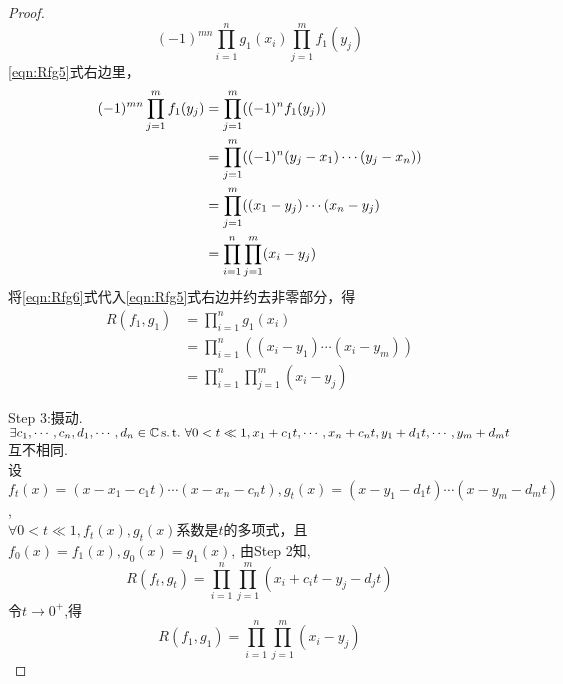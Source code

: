 \begin{proof}
\begin{equation}
    (-1)^{mn}\prod_{i=1}^ng_1(x_i)\prod_{j=1}^mf_1(y_j)
  \end{equation}
  \eqref{eqn:Rfg5}式右边里，
  \begin{align}\label{eqn:Rfg6}
    (-1)^{mn}\prod_{j=1}^mf_1(y_j)&=\prod_{j=1}^m((-1)^nf_1(y_j))\notag\\
                               &=\prod_{j=1}^m((-1)^n(y_j-x_1)\cdots(y_j-x_n))\notag\\
                               &=\prod_{j=1}^m((x_1-y_j)\cdots(x_n-y_j)\notag\\
                               &=\prod_{i=1}^n\prod_{j=1}^m(x_i-y_j)
  \end{align}
  将\eqref{eqn:Rfg6}式代入\eqref{eqn:Rfg5}式右边并约去非零部分，得
  \begin{align*}
    R(f_1,g_1) & = \prod_{i=1}^ng_1(x_i)\\
           & = \prod_{i=1}^n((x_i-y_1)\cdots(x_i-y_m))\\
           & = \prod_{i=1}^n\prod_{j=1}^m(x_i-y_j)
  \end{align*}

  {\heiti Step 3}:摄动.
  $\exists  c_1, \cdots, c_n, d_1, \cdots, d_n \in \mathbb{C}\\
  \operatorname{s.t.{}} \forall 0 < t \ll 1, x_1+c_1t, \cdots, x_n+c_nt, y_1+d_1t, \cdots, y_m+d_mt$互不相同.\\
  设$f_t(x)=(x-x_1-c_1t)\cdots(x-x_n-c_nt), g_t(x)=(x-y_1-d_1t)\cdots(x-y_m-d_mt)$,\\
  $\forall 0 < t \ll 1, f_t(x), g_t(x)$系数是$t$的多项式，且$f_0(x)=f_1(x), g_0(x)=g_1(x)$,
  由Step 2知,
  \begin{equation*}
    R(f_t,g_t)=\prod_{i=1}^n\prod_{j=1}^m(x_i+c_it-y_j-d_jt)
  \end{equation*}
  令$t\longrightarrow 0^+$,得
  \begin{equation*}
    R(f_1,g_1)=\prod_{i=1}^n\prod_{j=1}^m(x_i-y_j)
  \end{equation*}
\end{proof}
